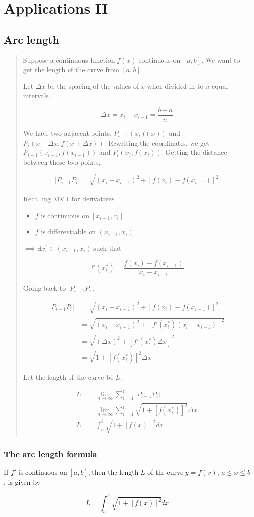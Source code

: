 \documentclass[
]{article}
\begin{document}
\hypertarget{applications-ii}{%
\section{Applications II}\label{applications-ii}}

\hypertarget{arc-length}{%
\subsection{Arc length}\label{arc-length}}

\begin{quote}
Suppose a continuous function \(f(x)\) continuous on \([a,b]\). We want
to get the length of the curve from \([a,b]\).

Let \(\Delta x\) be the spacing of the values of \(x\) when divided in
to \(n\) equal intervals.

\[\Delta x = x_i - x_{i-1} = \frac{b-a}{n} \]

We have two adjacent points, \(P_{i-1}(x, f(x))\) and
\(P_i(x+\Delta x, f(x + \Delta x))\). Rewriting the coordinates, we get
\(P_{i-1}(x_{i-1}, f(x_{i-1}))\) and \(P_i(x_i, f(x_i))\). Getting the
distance between these two points,

\[|P_{i-1}P_i| = \sqrt{(x_i-x_{i-1})^2 + \left[ f(x_i)-f(x_{i-1}) \right]^2}\]

Recalling MVT for derivatives,

\begin{itemize}
\item
  \(f\) is continuous on \([x_{i-1},x_i]\)
\item
  \(f\) is differentiable on \((x_{i-1},x_i)\)
\end{itemize}

\(\implies \exists x_i^* \in (x_{i-1},x_i)\) such that

\[f'(x_i^*) = \frac{f(x_i) - f(x_{i-1})}{x_i - x_{i-1}}\]

Going back to \(|P_{i-1}P_i|\),

\begin{align*}
|P_{i-1}P_i| &= \sqrt{(x_i-x_{i-1})^2 + \left[ f(x_i)-f(x_{i-1}) \right]^2}\\
&= \sqrt{(x_i-x_{i-1})^2 + \left[ f'(x_i^*) (x_i - x_{i-1}) \right]^2}\\
&= \sqrt{(\Delta x)^2 + \left[ f'(x_i^*) \Delta x \right]^2}\\
&= \sqrt{1+[f(x_i^*)]^2}\Delta x
\end{align*}

Let the length of the curve be \(L\).

\begin{align*}
L &= \lim_{n\to\infty} \sum_{i=1}^n |P_{i-1}P_i|\\
&= \lim_{n\to\infty} \sum_{i=1}^n \sqrt{1+[f(x_i^*)]^2}\Delta x\\
L &= \int_a^b \sqrt{1+[f(x)]^2}dx\\
\end{align*}
\end{quote}

\hypertarget{the-arc-length-formula}{%
\subsubsection{The arc length formula}\label{the-arc-length-formula}}

If \(f'\) is continuous on \([a,b]\), then the length \(L\) of the curve
\(y = f(x)\), \(a \leq x \leq b\), is given by

\[ L = \int_a^b \sqrt{1+[f(x)]^2}dx \]
\end{document}
